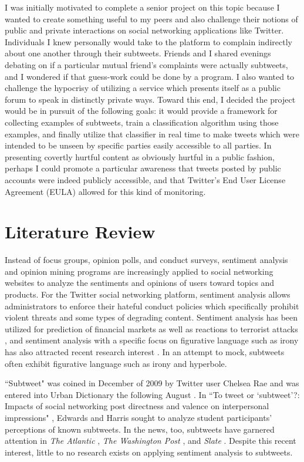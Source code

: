 \documentclass[11pt, twoside, reqno]{book}
\begin{document}
I was initially motivated to complete a senior project on this topic because I wanted to create something useful to my peers and also challenge their notions of public and private interactions on social networking applications like Twitter. Individuals I knew personally would take to the platform to complain indirectly about one another through their subtweets. Friends and I shared evenings debating on if a particular mutual friend's complaints were actually subtweets, and I wondered if that guess-work could be done by a program. I also wanted to challenge the hypocrisy of utilizing a service which presents itself as a public forum to speak in distinctly private ways. Toward this end, I decided the project would be in pursuit of the following goals: it would provide a framework for collecting examples of subtweets, train a classification algorithm using those examples, and finally utilize that classifier in real time to make tweets which were intended to be unseen by specific parties easily accessible to all parties. In presenting covertly hurtful content as obviously hurtful in a public fashion, perhaps I could promote a particular awareness that tweets posted by public accounts were indeed publicly accessible, and that Twitter's End User License Agreement (EULA) allowed for this kind of monitoring. 

\section{Literature Review}
\label{literature_review}

Instead of focus groups, opinion polls, and conduct surveys, sentiment analysis and opinion mining programs are increasingly applied to social networking websites to analyze the sentiments and opinions of users toward topics and products. For the Twitter social networking platform, sentiment analysis allows administrators to enforce their hateful conduct policies \cite{hateful_conduct} which specifically prohibit violent threats and some types of degrading content. Sentiment analysis has been utilized for prediction of financial markets \cite{sentiment_analysis_markets} as well as reactions to terrorist attacks \cite{sentiment_analysis_terrorism}, and sentiment analysis with a specific focus on figurative language such as irony has also attracted recent research interest \cite{sentiment_analysis_irony}. In an attempt to mock, subtweets often exhibit figurative language such as irony and hyperbole.

``Subtweet" was coined in December of 2009 by Twitter user Chelsea Rae \cite{first_subtweet} and was entered into Urban Dictionary the following August \cite{urban_dictionary}. In ``To tweet or ‘subtweet’?: Impacts of social networking post directness and valence on interpersonal impressions" \cite{subtweets_communications}, Edwards and Harris sought to analyze student participants' perceptions of known subtweets. In the news, too, subtweets have garnered attention in \textit{The Atlantic} \cite{the_atlantic}, \textit{The Washington Post} \cite{the_washington_post}, and \textit{Slate} \cite{slate}. Despite this recent interest, little to no research exists on applying sentiment analysis to subtweets.
\end{document}
